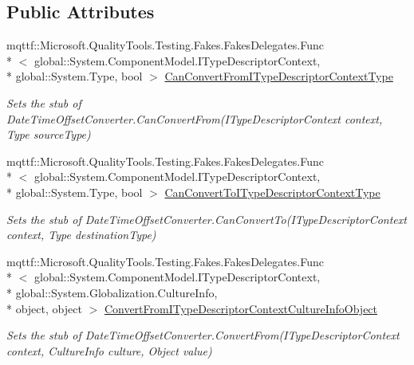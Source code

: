 \subsection*{Public Attributes}
\begin{DoxyCompactItemize}
\item 
mqttf\-::\-Microsoft.\-Quality\-Tools.\-Testing.\-Fakes.\-Fakes\-Delegates.\-Func\\*
$<$ global\-::\-System.\-Component\-Model.\-I\-Type\-Descriptor\-Context, \\*
global\-::\-System.\-Type, bool $>$ \hyperlink{class_system_1_1_component_model_1_1_fakes_1_1_stub_date_time_offset_converter_a0620d5ec145a00111b922e028a945311}{Can\-Convert\-From\-I\-Type\-Descriptor\-Context\-Type}
\begin{DoxyCompactList}\small\item\em Sets the stub of Date\-Time\-Offset\-Converter.\-Can\-Convert\-From(\-I\-Type\-Descriptor\-Context context, Type source\-Type)\end{DoxyCompactList}\item 
mqttf\-::\-Microsoft.\-Quality\-Tools.\-Testing.\-Fakes.\-Fakes\-Delegates.\-Func\\*
$<$ global\-::\-System.\-Component\-Model.\-I\-Type\-Descriptor\-Context, \\*
global\-::\-System.\-Type, bool $>$ \hyperlink{class_system_1_1_component_model_1_1_fakes_1_1_stub_date_time_offset_converter_a3748672e018f1e03df9ccc2a5800a804}{Can\-Convert\-To\-I\-Type\-Descriptor\-Context\-Type}
\begin{DoxyCompactList}\small\item\em Sets the stub of Date\-Time\-Offset\-Converter.\-Can\-Convert\-To(\-I\-Type\-Descriptor\-Context context, Type destination\-Type)\end{DoxyCompactList}\item 
mqttf\-::\-Microsoft.\-Quality\-Tools.\-Testing.\-Fakes.\-Fakes\-Delegates.\-Func\\*
$<$ global\-::\-System.\-Component\-Model.\-I\-Type\-Descriptor\-Context, \\*
global\-::\-System.\-Globalization.\-Culture\-Info, \\*
object, object $>$ \hyperlink{class_system_1_1_component_model_1_1_fakes_1_1_stub_date_time_offset_converter_ad495384c530cd6d2c5269427c5638a1e}{Convert\-From\-I\-Type\-Descriptor\-Context\-Culture\-Info\-Object}
\begin{DoxyCompactList}\small\item\em Sets the stub of Date\-Time\-Offset\-Converter.\-Convert\-From(\-I\-Type\-Descriptor\-Context context, Culture\-Info culture, Object value)\end{DoxyCompactList}\item 

\end{DoxyCompactItemize}
